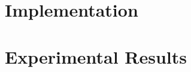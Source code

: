 \documentclass[12pt,twoside]{report}
\begin{document}
\chapter{Implementation}



\chapter{Experimental Results}




{}
%
\newpage
{} 


\end{document}
